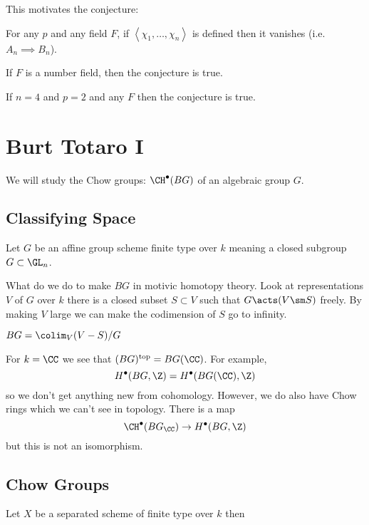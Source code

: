 \documentclass{article}
\renewcommand{\top}{\mathrm{top}}
\begin{document}
This motivates the conjecture:
\begin{conj}
For any $p$ and any field $F$, if $\left< \chi_1, \dots, \chi_n \right>$ is defined then it vanishes (i.e. $A_n \implies B_n$).
\end{conj}

\begin{theorem}
If $F$ is a number field, then the conjecture is true. 
\end{theorem}

\begin{theorem}[M-Scava, 2024]
If $n = 4$ and $p = 2$ and any $F$ then the conjecture is true. 
\end{theorem}

\section{Burt Totaro I}

We will study the Chow groups: $\CH^\bullet(BG)$ of an algebraic group $G$. 

\subsection{Classifying Space}

Let $G$ be an affine group scheme finite type over $k$ meaning a closed subgroup $G \subset \GL_n$. 



What do we do to make $B G$ in motivic homotopy theory. Look at representations $V$ of $G$ over $k$ there is a closed subset $S \subset V$ such that $G \acts (V \sm S)$ freely. By making $V$ large we can make the codimension of $S$ go to infinity. 

\begin{defn}
$BG = \colim_V (V - S)/G$
\end{defn}

For $k = \CC$ we see that $(BG)^{\top} = B G(\CC)$. For example,
\[ H^\bullet(BG, \Z) = H^\bullet(B G(\CC), \Z) \]
so we don't get anything new from cohomology. However, we do also have Chow rings which we can't see in topology. There is a map
\[ \CH^\bullet(BG_{\CC}) \to H^\bullet(BG, \Z) \]
but this is not an isomorphism. 

\subsection{Chow Groups}

Let $X$ be a separated scheme of finite type over $k$ then
\end{document}
